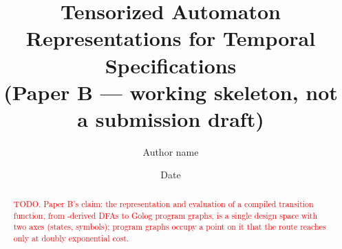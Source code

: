\documentclass{article}
\title{Tensorized Automaton Representations for Temporal Specifications\\
\large (Paper B --- working skeleton, not a submission draft)}
\author{Author name}
\date{Date}
\begin{document}
\maketitle

\begin{abstract}
\textcolor{red}{TODO. Paper B's claim: the representation and evaluation of a compiled
transition function, from \ltlf-derived DFAs to Golog program graphs, is a single
design space with two axes (states, symbols); program graphs occupy a point on it
that the \ltlf route reaches only at doubly exponential cost.}
\end{abstract}











\end{document}
